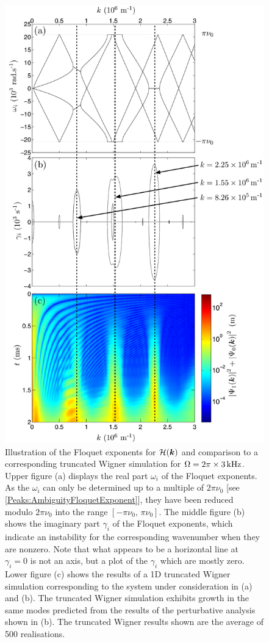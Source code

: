 \begin{figure}
    \centering
    \includegraphics[height=19cm]{CondensateEigenvalues}
    \caption{Illustration of the Floquet exponents for $\mathcal{H}(\bm{k})$ and comparison to a corresponding truncated Wigner simulation for $\Omega = 2\pi \times \unit[3]{kHz}$.
        Upper figure (a) displays the real part $\omega_i$ of the Floquet exponents. As the $\omega_i$ can only be determined up to a multiple of $2\pi\nu_0$ [see \eqref{Peaks:AmbiguityFloquetExponent}], they have been reduced modulo $2\pi\nu_0$ into the range $\left[-\pi\nu_0,\, \pi\nu_0\right]$.
        The middle figure (b) shows the imaginary part $\gamma_i$ of the Floquet exponents, which indicate an instability for the corresponding wavenumber when they are nonzero.  Note that what appears to be a horizontal line at $\gamma_i=0$ is not an axis, but a plot of the $\gamma_i$ which are mostly zero.
        Lower figure (c) shows the results of a 1D truncated Wigner simulation corresponding to the system under consideration in (a) and (b). The truncated Wigner simulation exhibits growth in the same modes predicted from the results of the perturbative analysis shown in (b). The truncated Wigner results shown are the average of 500 realisations.
        \label{Peaks:CondensateEigenvalues}}
\end{figure}

